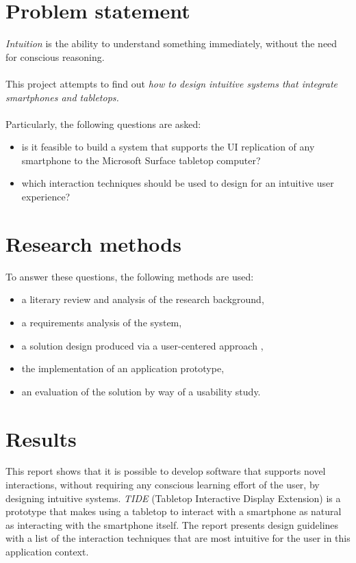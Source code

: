 \section{Problem statement}

\emph{Intuition} is the ability to understand something immediately, without the need for conscious reasoning.
\\\\
This project attempts to find out \emph{how to design intuitive systems that integrate smartphones and tabletops.}
\\\\
Particularly, the following questions are asked:
\begin{itemize}
\item is it feasible to build a system that supports the UI replication of any smartphone to the Microsoft Surface tabletop computer?
\item which interaction techniques should be used to design for an intuitive user experience?
\end{itemize}

\section{Research methods}

To answer these questions, the following methods are used:
\begin{itemize}
\item a literary review and analysis of the research background,
\item a requirements analysis of the system,
\item a solution design produced via a user-centered approach \citep{Benyon:2010},
\item the implementation of an application prototype,
\item an evaluation of the solution by way of a usability study.
\end{itemize}

\section{Results}

This report shows that it is possible to develop software that supports novel interactions, without requiring any conscious learning effort of the user, by designing intuitive systems.
\emph{TIDE} (Tabletop Interactive Display Extension) is a prototype that makes using a tabletop to interact with a smartphone as natural as interacting with the smartphone itself.
The report presents design guidelines with a list of the interaction techniques that are most intuitive for the user in this application context.

